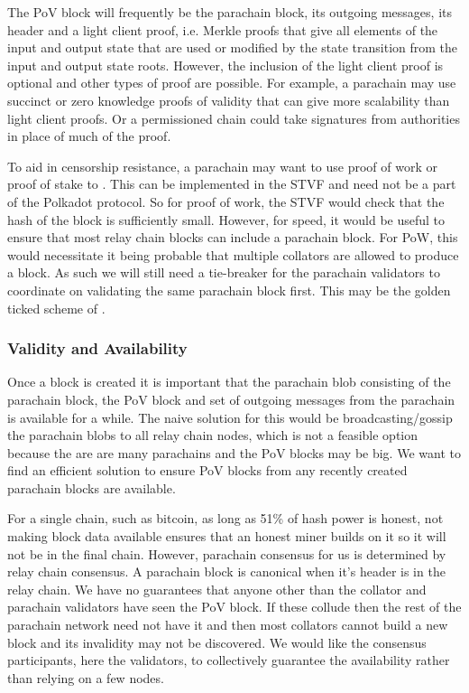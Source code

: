 The PoV block will frequently be the parachain block, its outgoing messages, its header and a light client proof,
i.e. Merkle proofs that give all elements of the input and output state that are used or modified by the state transition from the input and output state roots.
However, the inclusion of the light client proof is optional and other types of proof are possible.
For example, a parachain may use succinct or zero knowledge proofs of validity that can give more scalability than light client proofs.
Or a permissioned chain could take signatures from authorities in place of much of the proof.

To aid in censorship resistance, a parachain may want to use proof of work or proof of stake to .
This can be implemented in the STVF and need not be a part of the Polkadot protocol. So for proof of work,
the STVF would check that the hash of the block is sufficiently small.
However, for speed, it would be useful to ensure that most relay chain blocks can include a parachain block.
For PoW, this would necessitate it being probable that multiple collators are allowed to produce a block.
As such we will still need a tie-breaker for the parachain validators to coordinate on validating the same parachain block first.
This may be the golden ticked scheme of \cite{2016:Wood:Polkadot}.

\subsubsection{Validity and Availability} \label{sec:validity-and-availability}
Once a block is created it is important that the parachain blob consisting of the parachain block, the PoV block and set of outgoing messages from the parachain is available for a while.
The naive solution for this would be broadcasting/gossip the parachain blobs to all relay chain nodes, which is not a feasible option because the are are many parachains and the PoV blocks may be big.
We want to find an efficient solution to ensure PoV blocks from any recently created parachain blocks are available.

For a single chain, such as bitcoin, as long as 51\% of hash power is honest, not making block data available ensures that an honest miner builds on it so it will not be in the final chain. However, parachain consensus for us is determined by relay chain consensus.
A parachain block is canonical when it's header is in the relay chain.
We have no guarantees that anyone other than the collator and parachain validators have seen the PoV block.
If these collude then the rest of the parachain network need not have it and then most collators cannot build a new block and its invalidity may not be discovered.
We would like the consensus participants, here the validators, to collectively guarantee the availability rather than relying on a few nodes.

